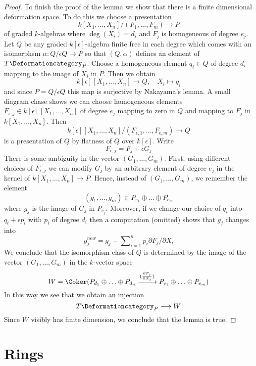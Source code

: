 \begin{proof}
\medskip\noindent
To finish the proof of the lemma we show that there is a finite
dimensional deformation space. To do this we
choose a presentation
$$
k[X_1, \ldots, X_n]/(F_1, \ldots, F_m) \longrightarrow P
$$
of graded $k$-algebras where $\deg(X_i) = d_i$ and
$F_j$ is homogeneous of degree $e_j$.
Let $Q$ be any graded $k[\epsilon]$-algebra
finite free in each degree which comes with an isomorphsm
$\alpha : Q/\epsilon Q \to P$ so that $(Q, \alpha)$ defines
an element of $T\Deformationcategory_P$.
Choose a homogeneous element $q_i \in Q$ of degree $d_i$
mapping to the image of $X_i$ in $P$.
Then we obtain
$$
k[\epsilon][X_1, \ldots, X_n] \longrightarrow Q,\quad
X_i \longmapsto q_i
$$
and since $P = Q/\epsilon Q$ this map is surjective by Nakayama's lemma.
A small diagram chase shows we can choose homogeneous elements
$F_{\epsilon, j} \in k[\epsilon][X_1, \ldots, X_n]$ of degree $e_j$
mapping to zero in $Q$ and mapping to $F_j$ in $k[X_1, \ldots, X_n]$.
Then
$$
k[\epsilon][X_1, \ldots, X_n]/(F_{\epsilon, 1}, \ldots, F_{\epsilon, m})
\longrightarrow Q
$$
is a presentation of $Q$ by flatness of $Q$ over $k[\epsilon]$.
Write
$$
F_{\epsilon, j} =  F_j + \epsilon G_j
$$
There is some ambiguity in the vector $(G_1, \ldots, G_m)$.
First, using different choices of $F_{\epsilon, j}$
we can modify $G_j$ by an arbitrary element of degree $e_j$
in the kernel of $k[X_1, \ldots, X_n] \to P$.
Hence, instead of $(G_1, \ldots, G_m)$, we remember the
element
$$
(g_1, \ldots, g_m) \in P_{e_1} \oplus \ldots \oplus P_{e_m}
$$
where $g_j$ is the image of $G_j$ in $P_{e_j}$.
Moreover, if we change our choice of $q_i$ into $q_i + \epsilon p_i$
with $p_i$ of degree $d_i$ then a computation (omitted) shows
that $g_j$ changes into
$$
g_j^{new} = g_j - \sum\nolimits_{i = 1}^n p_i \partial F_j / \partial X_i
$$
We conclude that the isomorphism class of $Q$ is determined by the
image of the vector $(G_1, \ldots, G_m)$ in the $k$-vector space
$$
W  = \Coker(P_{d_1} \oplus \ldots \oplus P_{d_n}
\xrightarrow{(\frac{\partial F_j}{\partial X_i})}
P_{e_1} \oplus \ldots \oplus P_{e_m})
$$
In this way we see that we obtain an injection
$$
T\Deformationcategory_P \longrightarrow W
$$
Since $W$ visibly has finite dimension, we conclude that the lemma is true.
\end{proof}





\section{Rings}
\label{section-rings}

